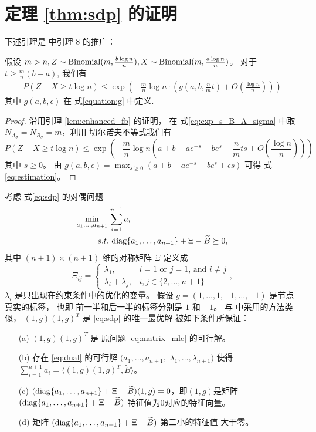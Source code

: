 \section{定理 \ref{thm:sdp} 的证明}
\label{sec:thm_sdp_proof}

下述引理是
\citet{abbe2015exact}
中引理 8 的推广：
\begin{lemma}\label{lem:zxt}
    假设 $m > n, Z \sim \operatorname{Binomial}(m, \frac{b\log n}{n}), X\sim \operatorname{Binomial}(m, \frac{a\log n}{n})$。
    对于 $ t \geq \frac{m}{n}(b - a)$, 我们有
    \begin{align}\label{eq:estimation}
        P(Z - X \geq t \log n) \leq \exp(-\frac{m}{n}\log n \cdot ( g(a, b, \frac{n}{m}t) + O(\frac{\log n}{n})))
    \end{align}
    其中 $g(a,b,\epsilon)$ 在 式\eqref{equation:g} 中定义.
\end{lemma}
\begin{proof}
    沿用引理 \ref{lem:enhanced_fb} 的证明，
在 式\eqref{eq:exp_s_B_A_sigma}
中取  $N_{A_{\bar{\sigma}}}
=N_{B_{\bar{\sigma}}}=m$，利用
切尔诺夫不等式我们有
\begin{equation*}
    P(Z - X \geq t \log n) \leq \exp(-\frac{m}{n}\log n (a+b-ae^{-s}-be^s+\frac{n}{m}ts + O(\frac{\log n}{n})))
\end{equation*}
其中 $s \geq 0$。
由 $g(a,b,\epsilon) = 
\max_{s \geq 0} (a+b-a e^{-s} - b e^s + \epsilon s)$
可得 式 \eqref{eq:estimation}。
\end{proof}
考虑 式\eqref{eq:sdp} 的对偶问题
\begin{align}
    \min_{a_1, \dots, a_{n+1}}\, &\sum_{i=1}^{n+1} a_i \nonumber\\
    \label{eq:dual}
    s.t. &\, \operatorname{diag}\{a_1, \dots, a_{n+1}\} + \Xi - \widetilde{B} \succeq 0, 
\end{align}
其中 $(n+1)\times (n+1)$ 维的对称矩阵
$\Xi$ 定义成 
\begin{equation}
    \Xi_{ij} = \begin{cases}
        \lambda_1, & i=1\text{ or }j=1 \text{, and }i\ne j\\
        \lambda_i + \lambda_j, & i, j\in\{2,\ldots,n+1\}
    \end{cases},
\end{equation}
$\lambda_i$ 是只出现在约束条件中的优化的变量。
假设 $g=(1,\ldots,1,-1,\ldots,-1)$ 是节点真实的标签，
也即
前一半和后一半的标签分别是  $1$ 和 $-1$。
与 \citet{abbe2015exact} 中采用的方法类似，
$(1,g)(1,g)^T$ 是 \eqref{eq:sdp} 的唯一最优解
 被如下条件所保证：
\begin{enumerate}
    \item[(a)] $(1,g)(1,g)^T$ 是 原问题 \eqref{eq:matrix_mle} 的可行解。
    \item[(b)] 存在 \eqref{eq:dual} 的可行解 $(a_1,\ldots,a_{n+1},$ $\lambda_1,\ldots,\lambda_{n+1})$ 使得
    $\sum_{i=1}^{n+1} a_i=\langle(1,g)(1,g)^T,\widetilde{B} \rangle$。
    \item[(c)] $(\operatorname{diag}\{a_1, \dots, a_{n+1}\} + \Xi - \widetilde{B})(1,g)=0$，即$(1,g)$是矩阵 $(\operatorname{diag}\{a_1, \dots, a_{n+1}\} + \Xi - \widetilde{B})$ 特征值为0对应的特征向量。
    \item[(d)]  矩阵 $(\operatorname{diag}\{a_1, \dots, a_{n+1}\} + \Xi - \widetilde{B})$ 第二小的特征值 大于零。 
\end{enumerate}
